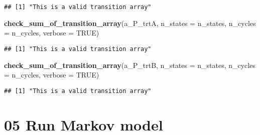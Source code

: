 \documentclass[
]{article}
\newenvironment{Shaded}{\begin{snugshade}}{\end{snugshade}}
\newcommand{\AttributeTok}[1]{\textcolor[rgb]{0.13,0.29,0.53}{#1}}
\newcommand{\ConstantTok}[1]{\textcolor[rgb]{0.56,0.35,0.01}{#1}}
\newcommand{\FunctionTok}[1]{\textcolor[rgb]{0.13,0.29,0.53}{\textbf{#1}}}
\newcommand{\NormalTok}[1]{#1}
\begin{document}
\begin{verbatim}
## [1] "This is a valid transition array"
\end{verbatim}

\begin{Shaded}
\begin{Highlighting}[]
\FunctionTok{check\_sum\_of\_transition\_array}\NormalTok{(a\_P\_trtA, }\AttributeTok{n\_states =}\NormalTok{ n\_states, }\AttributeTok{n\_cycles =}\NormalTok{ n\_cycles, }\AttributeTok{verbose =} \ConstantTok{TRUE}\NormalTok{)}
\end{Highlighting}
\end{Shaded}

\begin{verbatim}
## [1] "This is a valid transition array"
\end{verbatim}

\begin{Shaded}
\begin{Highlighting}[]
\FunctionTok{check\_sum\_of\_transition\_array}\NormalTok{(a\_P\_trtB, }\AttributeTok{n\_states =}\NormalTok{ n\_states, }\AttributeTok{n\_cycles =}\NormalTok{ n\_cycles, }\AttributeTok{verbose =} \ConstantTok{TRUE}\NormalTok{)}
\end{Highlighting}
\end{Shaded}

\begin{verbatim}
## [1] "This is a valid transition array"
\end{verbatim}

\hypertarget{run-markov-model}{%
\section{05 Run Markov model}\label{run-markov-model}}
\end{document}
